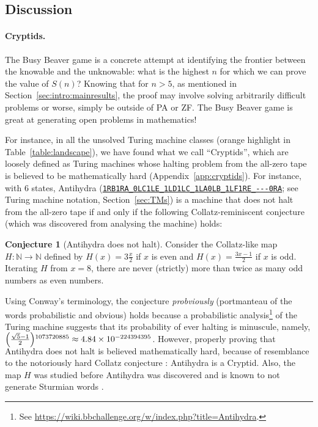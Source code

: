 \documentclass[a4paper,british]{article}
\theoremstyle{definition} %
\newtheorem{conjecture}{Conjecture}[section]
\numberwithin{equation}{section}
\theoremstyle{definition} %
\newcommand{\tm}[1]{\href{https://bbchallenge.org/#1}{\texttt{\nolinkurl{#1}}}}
\begin{document}
\subsection{Discussion}\label{sec:intro:discuss}

\paragraph{Cryptids.} The Busy Beaver game is a concrete attempt at identifying the frontier between the knowable and the unknowable: what is the highest $n$ for which we can prove the value of $S(n)$? Knowing that for $n > 5$, as mentioned in Section~\ref{sec:intro:mainresults}, the proof may involve solving arbitrarily difficult problems or worse, simply be outside of PA or ZF. The Busy Beaver game is great at generating open problems in mathematics!


For instance, in all the unsolved Turing machine classes (orange highlight in Table~\ref{table:landscape}), we have found what we call ``Cryptids'', which are loosely defined as Turing machines whose halting problem from the all-zero tape is believed to be mathematically hard (Appendix~\ref{app:cryptids}). For instance, with 6 states, Antihydra (\tm{1RB1RA_0LC1LE_1LD1LC_1LA0LB_1LF1RE_---0RA}; see Turing machine notation, Section~\ref{sec:TMs}) is a machine that does not halt from the all-zero tape if and only if the following Collatz-reminiscent conjecture (which was discovered from analysing the machine) holds:


\begin{conjecture}[Antihydra does not halt]
    Consider the Collatz-like map $H: \mathbb{N} \to \mathbb{N}$ defined by $H(x) = 3\frac{x}{2}$ if $x$ is even and $H(x) = \frac{3x-1}{2}$ if $x$ is odd. Iterating $H$ from $x=8$, there are never (strictly) more than twice as many odd numbers as even numbers.
\end{conjecture}

Using Conway's terminology, the conjecture \textit{probviously} (portmanteau of the words probabilistic and obvious) holds because a probabilistic analysis\footnote{See \url{https://wiki.bbchallenge.org/w/index.php?title=Antihydra}.} of the Turing machine suggests that its probability of ever halting is minuscule, namely, $\smash{\left(\frac{\sqrt{5}-1}{2}\right)}^{1073720885}\approx 4.84\times 10^{-224394395}$. However, properly proving that Antihydra does not halt is believed mathematically hard, because of resemblance to the notoriously hard Collatz conjecture \cite{LagariasCollatz}: Antihydra is a Cryptid. Also, the map $H$ was studied before Antihydra was discovered and is known to not generate Sturmian words \cite{DUBICKAS_2009}.
\end{document}
